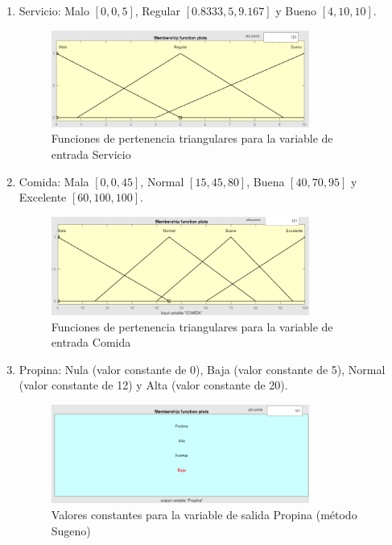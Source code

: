 \documentclass[11pt, letterpaper]{article}
\begin{document}
\begin{enumerate}
	\item Servicio: Malo $[0,0,5]$, Regular $[0.8333,5,9.167]$ y Bueno $[4,10,10]$.
	\begin{figure}[h]
		\centering
		\includegraphics[width=0.8\textwidth]{IMG/P11.png}
		\caption{Funciones de pertenencia triangulares para la variable de entrada Servicio}
	\end{figure}
	
	\newpage
	
	\item Comida: Mala $[0,0,45]$, Normal $[15,45,80]$, Buena $[40,70,95]$ y Excelente $[60,100,100]$.
	\begin{figure}[h]
		\centering
		\includegraphics[width=0.8\textwidth]{IMG/P12.png}
		\caption{Funciones de pertenencia triangulares para la variable de entrada Comida}
	\end{figure}
	
	\item Propina: Nula (valor constante de 0), Baja (valor constante de 5), Normal (valor constante de 12) y Alta (valor constante de 20).
	\begin{figure}[h]
		\centering
		\includegraphics[width=0.8\textwidth]{IMG/P13.png}
		\caption{Valores constantes para la variable de salida Propina (método Sugeno)}
	\end{figure}
\end{enumerate}
\end{document}
